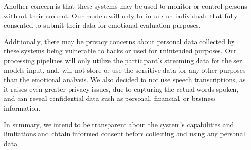 Another concern is that these systems may be used to monitor or control persons without their consent. Our models will only be in use on individuals that fully consented to submit their data for emotional evaluation purposes.

Additionally, there may be privacy concerns about personal data collected by these systems being vulnerable to hacks or used for unintended purposes. Our processing pipelines will only utilize the participant's streaming data for the \ac{ser} models input, and, will not store or use the sensitive data for any other purposes than the emotional analysis. We also decided to not use speech transcriptions, as it raises even greater privacy issues, due to capturing the actual words spoken, and can reveal confidential data such as personal, financial, or business information.

In summary, we intend to be transparent about the system's capabilities and limitations and obtain informed consent before collecting and using any personal data.

